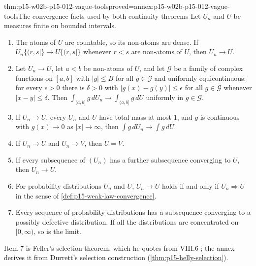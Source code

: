\begin{hblemma}{thm:p15-w02b-p15-012-vague-tools}{proved=annex:p15-w02b-p15-012-vague-tools}{The convergence facts used by both continuity theorems}
Let \(U_n\) and \(U\) be measures finite on bounded intervals.
\begin{enumerate}
\item The atoms of \(U\) are countable, so its non-atoms are dense. If
      \(U_n\{(r,s]\}\to U\{(r,s]\}\) whenever \(r<s\) are non-atoms of \(U\),
      then \(U_n\to U\).
\item Let \(U_n\to U\), let \(a<b\) be non-atoms of \(U\), and let
      \(\mathcal G\) be a family of complex functions on \([a,b]\) with
      \(|g|\leq B\) for all \(g\in\mathcal G\) and uniformly equicontinuous:
      for every \(\epsilon>0\) there is \(\delta>0\) with
      \(|g(x)-g(y)|\leq\epsilon\) for all \(g\in\mathcal G\) whenever
      \(|x-y|\leq\delta\). Then
      \(\int_{(a,b]}g\,dU_n\to\int_{(a,b]}g\,dU\) uniformly in
      \(g\in\mathcal G\).
\item If \(U_n\to U\), every \(U_n\) and \(U\) have total mass at most \(1\),
      and \(g\) is continuous with \(g(x)\to0\) as \(|x|\to\infty\), then
      \(\int g\,dU_n\to\int g\,dU\).
\item If \(U_n\to U\) and \(U_n\to V\), then \(U=V\).
\item If every subsequence of \((U_n)\) has a further subsequence converging
      to \(U\), then \(U_n\to U\).
\item For probability distributions \(U_n\) and \(U\), \(U_n\to U\) holds if
      and only if \(U_n\Rightarrow U\) in the sense of
      \cref{def:p15-weak-law-convergence}.
\item Every sequence of probability distributions has a subsequence
      converging to a possibly defective distribution. If all the
      distributions are concentrated on \([0,\infty)\), so is the limit.
\end{enumerate}
\end{hblemma}

Item 7 is Feller's selection theorem, which he quotes from VIII.6
\cite[vol.~II, XIII.1, p.~431]{Feller1971ProbabilityII}; the annex derives it
from Durrett's selection construction (\cref{thm:p15-helly-selection}).

